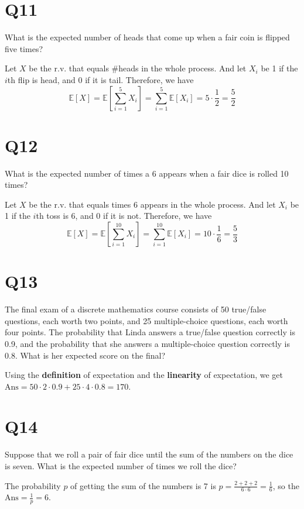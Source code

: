 \documentclass[11pt]{article}
\begin{document}
\section*{Q11}
What is the expected number of heads that come up when a
fair coin is flipped five times?
\begin{solution}
    Let $X$ be the r.v. that equals \#heads in the whole process. And
    let $X_{i}$ be 1 if the $i$th flip is head, and 0 if it is tail. 
    Therefore, we have 
    $$
    \mathbb{E}[X]=\mathbb{E}\left[ \sum_{i=1}^{5}X_{i} \right]=\sum_{i=1}^{5}\mathbb{E}[X_{i}]=5\cdot \frac{1}{2}=\frac{5}{2}
    $$
\end{solution}

\section*{Q12}
What is the expected number of times a 6 appears when a fair
dice is rolled 10 times?
\begin{solution}
    Let $X$ be the r.v. that equals times 6 appears in the whole process. And
    let $X_{i}$ be 1 if the $i$th toss is 6, and 0 if it is not. 
    Therefore, we have 
    $$
    \mathbb{E}[X]=\mathbb{E}\left[ \sum_{i=1}^{10}X_{i} \right]=\sum_{i=1}^{10}\mathbb{E}[X_{i}]=10\cdot \frac{1}{6}=\frac{5}{3}
    $$
\end{solution}
\section*{Q13}
The final exam of a discrete mathematics course consists of 50
true/false questions, each worth two points, and 25
multiple-choice questions, each worth four points. The
probability that Linda answers a true/false question correctly is
0.9, and the probability that she answers a multiple-choice
question correctly is 0.8. What is her expected score on the
final?
\begin{solution}
    Using the \textbf{definition} of expectation and the \textbf{linearity} of expectation, we get $\text{Ans}=50\cdot 2\cdot 0.9+25\cdot 4\cdot 0.8=170$.
\end{solution}

\section*{Q14}
Suppose that we roll a pair of fair dice until the sum of the
numbers on the dice is seven. What is the expected number of
times we roll the dice?
\begin{solution}
    The probability $p$ of getting the sum of the numbers is 7
    is $p=\frac{2+2+2}{6\cdot 6}=\frac{1}{6}$, so the $\text{Ans}=\frac{1}{p}=6$.
\end{solution}
\end{document}
